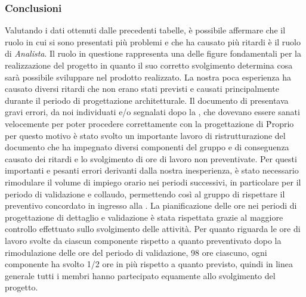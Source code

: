 \subsubsection{Conclusioni}
Valutando i dati ottenuti dalle precedenti tabelle, è possibile affermare che il ruolo in cui si sono presentati più problemi e che ha causato più ritardi è il ruolo di \textit{Analista}.
Il ruolo in questione rappresenta una delle figure fondamentali per la realizzazione del progetto in quanto il suo corretto svolgimento determina cosa sarà possibile sviluppare nel prodotto realizzato. La nostra poca esperienza ha causato diversi ritardi che non erano stati previsti e causati principalmente durante il periodo di progettazione architetturale. Il documento di \AdRv{} presentava gravi errori, da noi individuati e/o segnalati dopo la , che dovevano essere sanati velocemente per poter procedere correttamente con la progettazione di \NomeProgetto\. Proprio per questo motivo è stato svolto un importante lavoro di ristrutturazione del documento che ha impegnato diversi componenti del gruppo e di conseguenza causato dei ritardi e lo svolgimento di ore di lavoro non preventivate. Per questi importanti e pesanti errori derivanti dalla nostra inesperienza, è stato necessario rimodulare il volume di impiego orario nei periodi successivi, in particolare per il periodo di validazione e collaudo, permettendo così al gruppo di rispettare il preventivo concordato in ingresso alla . 
La pianificazione delle ore nei periodi di progettazione di dettaglio e validazione è stata rispettata grazie al maggiore controllo effettuato sullo svolgimento delle attività. Per quanto riguarda le ore di lavoro svolte da ciascun componente rispetto a quanto preventivato dopo la rimodulazione delle ore del periodo di validazione, 98 ore ciascuno, ogni componente ha svolto 1/2 ore in più rispetto a quanto previsto, quindi in linea generale tutti i membri hanno partecipato equamente allo svolgimento del progetto.
